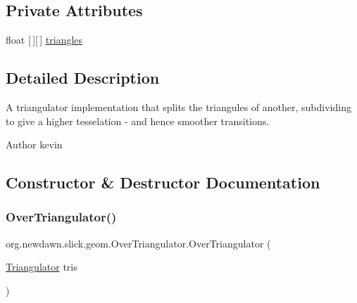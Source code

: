 \subsection*{Private Attributes}
\begin{DoxyCompactItemize}
\item 
float \mbox{[}$\,$\mbox{]}\mbox{[}$\,$\mbox{]} \mbox{\hyperlink{classorg_1_1newdawn_1_1slick_1_1geom_1_1_over_triangulator_a81f4d764fe0327ce4cd6692e777cc5f6}{triangles}}
\end{DoxyCompactItemize}


\subsection{Detailed Description}
A triangulator implementation that splits the triangules of another, subdividing to give a higher tesselation -\/ and hence smoother transitions.

\begin{DoxyAuthor}{Author}
kevin 
\end{DoxyAuthor}


\subsection{Constructor \& Destructor Documentation}
\mbox{\label{classorg_1_1newdawn_1_1slick_1_1geom_1_1_over_triangulator_a0ad4c088ff134dbc7ac735949509e18a}} 
\subsubsection{\texorpdfstring{Over\+Triangulator()}{OverTriangulator()}}
{\footnotesize\ttfamily org.\+newdawn.\+slick.\+geom.\+Over\+Triangulator.\+Over\+Triangulator (\begin{DoxyParamCaption}\item[{\mbox{\hyperlink{interfaceorg_1_1newdawn_1_1slick_1_1geom_1_1_triangulator}{Triangulator}}}]{tris }\end{DoxyParamCaption})\hspace{0.3cm}{\ttfamily [inline]}}

